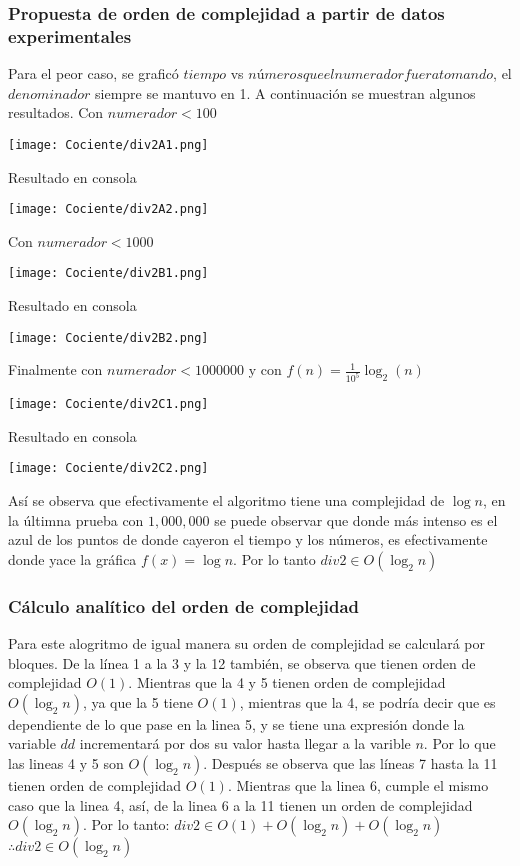 \documentclass[12pt,twoside]{article}
\begin{document}
\subsubsection{Propuesta de orden de complejidad a partir de datos experimentales}
Para el peor caso, se graficó $tiempo$ vs $números que el numerador fuera tomando$, el $denominador$ siempre se mantuvo en 1. A continuación se muestran algunos resultados.\newline\newline
Con $numerador < 100$
\begin{center}
    \texttt{[image: Cociente/div2A1.png]}
\end{center}
Resultado en consola
\begin{center}
    \texttt{[image: Cociente/div2A2.png]}
\end{center}
Con $numerador < 1000$
\begin{center}
    \texttt{[image: Cociente/div2B1.png]}
\end{center}
Resultado en consola
\begin{center}
    \texttt{[image: Cociente/div2B2.png]}
\end{center}
Finalmente con $numerador < 1000000$ y con $f(n) = \frac{1}{10^5}\log_2(n)$
\begin{center}
    \texttt{[image: Cociente/div2C1.png]}
\end{center}
Resultado en consola
\begin{center}
    \texttt{[image: Cociente/div2C2.png]}
\end{center}
Así se observa que efectivamente el algoritmo tiene una complejidad de $\log n$, en la últimna prueba con $1,000,000$ se puede observar que donde más intenso es el azul de los puntos de donde cayeron el tiempo y los números, es efectivamente donde yace la gráfica $f(x) = \log n$. Por lo tanto\newline\newline
$div2 \in O(\log_2n)$
\subsubsection{Cálculo analítico del orden de complejidad}
Para este alogritmo de igual manera su orden de complejidad se calculará por bloques.\newline
De la línea 1 a la 3 y la 12 también, se observa que tienen orden de complejidad $O(1)$. Mientras que la 4 y 5 tienen orden de complejidad $O(\log_2n)$, ya que la 5 tiene $O(1)$, mientras que la 4, se podría decir que es dependiente de lo que pase en la linea 5, y se tiene una expresión donde la variable $dd$ incrementará por dos su valor hasta llegar a la varible $n$. Por lo que las lineas 4 y 5 son $O(\log_2n)$. Después se observa que las líneas 7 hasta la 11 tienen orden de complejidad $O(1)$. Mientras que la linea 6, cumple el mismo caso que la linea 4, así, de la linea 6 a la 11 tienen un orden de complejidad $O(\log_2n)$. Por lo tanto:\newline\newline
$div2 \in O(1) + O(\log_2n) + O(\log_2n)$\newline
$\therefore div2 \in O(\log_2n)$
\end{document}
